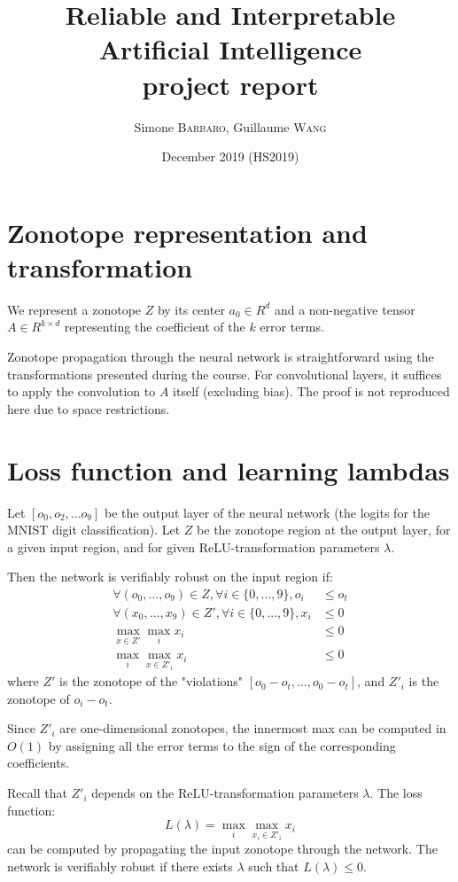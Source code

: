 \documentclass{article}
\title{Reliable and Interpretable Artificial Intelligence \\ project report}
\author{Simone \textsc{Barbaro}, Guillaume \textsc{Wang}}
\date{\small{ December 2019 (HS2019)}}
\begin{document}
\maketitle

\section{Zonotope representation and transformation}

We represent a zonotope $Z$ by its center $a_0 \in R^d$ and a non-negative tensor $A \in R^{k \times d}$ representing the coefficient of the $k$ error terms.

Zonotope propagation through the neural network is straightforward using the transformations presented during the course.
For convolutional layers, it suffices to apply the convolution to $A$ itself (excluding bias).
The proof is not reproduced here due to space restrictions.

\section{Loss function and learning lambdas}

Let $[o_0, o_2, ... o_9]$ be the output layer of the neural network (the logits for the MNIST digit classification). 
Let $Z$ be the zonotope region at the output layer, for a given input region, and for given ReLU-transformation parameters $\lambda$.

Then the network is verifiably robust on the input region if:
\begin{align*}
    \forall (o_0, ..., o_9) \in Z, \forall i \in \{0, ..., 9\}, o_i &\leq o_t \\
    \forall (x_0, ..., x_9) \in Z', \forall i \in \{0, ..., 9\}, x_i &\leq 0 \\
    \max_{x \in Z'} \max_i x_i &\leq 0 \\
    \max_i \max_{x \in Z'_i} x_i &\leq 0
\end{align*}
where $Z'$ is the zonotope of the "violations" $[o_0 - o_t, ..., o_0 - o_t]$, and $Z'_i$ is the zonotope of $o_i - o_t$.

Since $Z'_i$ are one-dimensional zonotopes, the innermost max can be computed in $O(1)$ by assigning all the error terms to the sign of the corresponding coefficients.

Recall that $Z'_i$ depends on the ReLU-transformation parameters $\lambda$. The loss function:
\begin{equation*}
    L(\lambda) = \max_i \max_{x_i \in Z'_i} x_i
\end{equation*}
can be computed by propagating the input zonotope through the network.
The network is verifiably robust if there exists $\lambda$ such that $L(\lambda) \leq 0$.
\end{document}
